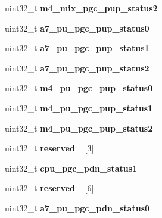 \begin{DoxyCompactItemize}
\item 
\mbox{\label{structimx__gpc_ac0e3acb898d04000d4f1f18a45f975b8}} 
uint32\+\_\+t {\bfseries m4\+\_\+mix\+\_\+pgc\+\_\+pup\+\_\+status2}
\item 
\mbox{\label{structimx__gpc_a78ff745f04f30e42f6cfddc34383791f}} 
uint32\+\_\+t {\bfseries a7\+\_\+pu\+\_\+pgc\+\_\+pup\+\_\+status0}
\item 
\mbox{\label{structimx__gpc_a2823bba6004994fda69a7208f2978d03}} 
uint32\+\_\+t {\bfseries a7\+\_\+pu\+\_\+pgc\+\_\+pup\+\_\+status1}
\item 
\mbox{\label{structimx__gpc_a511807badadc0be0bb5434bc062e9013}} 
uint32\+\_\+t {\bfseries a7\+\_\+pu\+\_\+pgc\+\_\+pup\+\_\+status2}
\item 
\mbox{\label{structimx__gpc_a32fbc8eccb71fd683e8ff7dd1ffe437d}} 
uint32\+\_\+t {\bfseries m4\+\_\+pu\+\_\+pgc\+\_\+pup\+\_\+status0}
\item 
\mbox{\label{structimx__gpc_a0d35b42b92f2b7eba9c7495030b32850}} 
uint32\+\_\+t {\bfseries m4\+\_\+pu\+\_\+pgc\+\_\+pup\+\_\+status1}
\item 
\mbox{\label{structimx__gpc_a81c0fd942f58e816b4f8019721dc9d88}} 
uint32\+\_\+t {\bfseries m4\+\_\+pu\+\_\+pgc\+\_\+pup\+\_\+status2}
\item 
\mbox{\label{structimx__gpc_a38999745c3a7a03da81dc29fb73a7312}} 
uint32\+\_\+t {\bfseries reserved\+\_} \mbox{[}3\mbox{]}
\item 
\mbox{\label{structimx__gpc_a19fe2d75fa0a3aa4ff6c02716ab65a63}} 
uint32\+\_\+t {\bfseries cpu\+\_\+pgc\+\_\+pdn\+\_\+status1}
\item 
\mbox{\label{structimx__gpc_a5fd6c2b647581da7a95b9ffc7502100b}} 
uint32\+\_\+t {\bfseries reserved\+\_} \mbox{[}6\mbox{]}
\item 
\mbox{\label{structimx__gpc_aa3825cefbf84babccd47bf8441806e78}} 
uint32\+\_\+t {\bfseries a7\+\_\+pu\+\_\+pgc\+\_\+pdn\+\_\+status0}

\end{DoxyCompactItemize}
